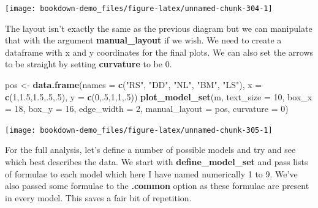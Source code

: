 \documentclass[
]{book}
\newenvironment{Shaded}{\begin{snugshade}}{\end{snugshade}}
\newcommand{\DataTypeTok}[1]{\textcolor[rgb]{0.13,0.29,0.53}{#1}}
\newcommand{\DecValTok}[1]{\textcolor[rgb]{0.00,0.00,0.81}{#1}}
\newcommand{\FloatTok}[1]{\textcolor[rgb]{0.00,0.00,0.81}{#1}}
\newcommand{\KeywordTok}[1]{\textcolor[rgb]{0.13,0.29,0.53}{\textbf{#1}}}
\newcommand{\NormalTok}[1]{#1}
\newcommand{\StringTok}[1]{\textcolor[rgb]{0.31,0.60,0.02}{#1}}
\begin{document}
\begin{center}\texttt{[image: bookdown-demo\_files/figure-latex/unnamed-chunk-304-1]} \end{center}

The layout isn't exactly the same as the previous diagram but we can manipulate that with the argument \textbf{manual\_layout} if we wish. We need to create a dataframe with x and y coordinates for the final plots. We can also set the arrows to be straight by setting \textbf{curvature} to be 0.

\begin{Shaded}
\begin{Highlighting}[]
\NormalTok{pos \textless{}{-}}\StringTok{ }\KeywordTok{data.frame}\NormalTok{(}\DataTypeTok{names =} \KeywordTok{c}\NormalTok{(}\StringTok{"RS"}\NormalTok{, }\StringTok{"DD"}\NormalTok{, }\StringTok{"NL"}\NormalTok{, }\StringTok{"BM"}\NormalTok{, }\StringTok{"LS"}\NormalTok{),}
                  \DataTypeTok{x =} \KeywordTok{c}\NormalTok{(}\DecValTok{1}\NormalTok{,}\FloatTok{1.5}\NormalTok{,}\FloatTok{1.5}\NormalTok{,.}\DecValTok{5}\NormalTok{,.}\DecValTok{5}\NormalTok{),}
                  \DataTypeTok{y =} \KeywordTok{c}\NormalTok{(}\DecValTok{0}\NormalTok{,.}\DecValTok{5}\NormalTok{,}\DecValTok{1}\NormalTok{,}\DecValTok{1}\NormalTok{,.}\DecValTok{5}\NormalTok{))}
\KeywordTok{plot\_model\_set}\NormalTok{(m, }\DataTypeTok{text\_size =} \DecValTok{10}\NormalTok{, }\DataTypeTok{box\_x =} \DecValTok{18}\NormalTok{, }\DataTypeTok{box\_y =} \DecValTok{16}\NormalTok{,}
               \DataTypeTok{edge\_width =} \DecValTok{2}\NormalTok{, }\DataTypeTok{manual\_layout =}\NormalTok{ pos, }\DataTypeTok{curvature =} \DecValTok{0}\NormalTok{)}
\end{Highlighting}
\end{Shaded}

\begin{center}\texttt{[image: bookdown-demo\_files/figure-latex/unnamed-chunk-305-1]} \end{center}

For the full analysis, let's define a number of possible models and try and see which best describes the data. We start with \textbf{define\_model\_set} and pass lists of formulae to each model which here I have named numerically 1 to 9. We've also passed some formulae to the \textbf{.common} option as these formulae are present in every model. This saves a fair bit of repetition.
\end{document}
